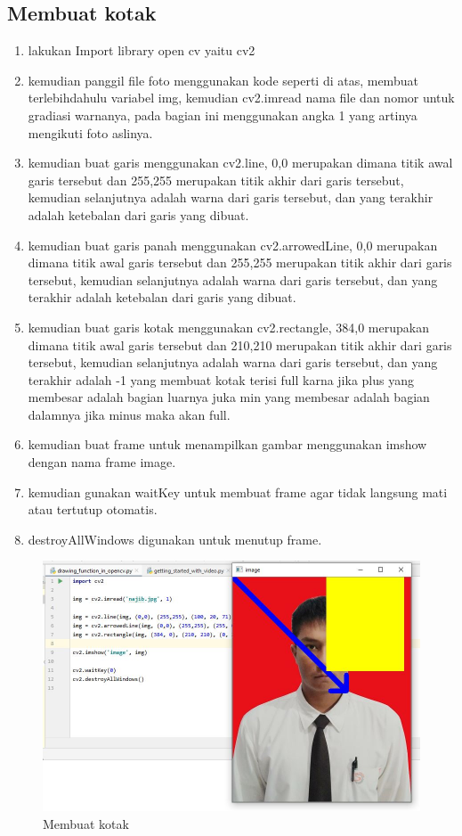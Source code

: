 \subsection{Membuat kotak}

\begin{enumerate}
	\item lakukan Import library open cv yaitu cv2
	\item kemudian panggil file foto menggunakan kode seperti di atas, membuat terlebihdahulu variabel img, kemudian cv2.imread nama file dan nomor untuk gradiasi warnanya, pada bagian ini menggunakan angka 1 yang artinya mengikuti foto aslinya.
	\item kemudian buat garis menggunakan cv2.line, 0,0 merupakan dimana titik awal garis tersebut dan 255,255 merupakan titik akhir dari garis tersebut, kemudian selanjutnya adalah warna dari garis tersebut, dan yang terakhir adalah ketebalan dari garis yang dibuat.
	\item kemudian buat garis panah menggunakan cv2.arrowedLine, 0,0 merupakan dimana titik awal garis tersebut dan 255,255 merupakan titik akhir dari garis tersebut, kemudian selanjutnya adalah warna dari garis tersebut, dan yang terakhir adalah ketebalan dari garis yang dibuat.
	\item kemudian buat garis kotak menggunakan cv2.rectangle, 384,0 merupakan dimana titik awal garis tersebut dan 210,210 merupakan titik akhir dari garis tersebut, kemudian selanjutnya adalah warna dari garis tersebut, dan yang terakhir adalah -1 yang membuat kotak terisi full karna jika plus yang membesar adalah bagian luarnya juka min yang membesar adalah bagian dalamnya jika minus maka akan full.
	\item kemudian buat frame untuk menampilkan gambar menggunakan imshow dengan nama frame image.
	\item kemudian gunakan waitKey untuk membuat frame agar tidak langsung mati atau tertutup otomatis.
	\item destroyAllWindows digunakan untuk menutup frame.
\end{enumerate}

\newpage
\begin{figure}[ht]
\centering
\includegraphics[scale=0.55]{figures/2,12.jpg}
\caption{Membuat kotak}
\label{contoh}
\end{figure}

